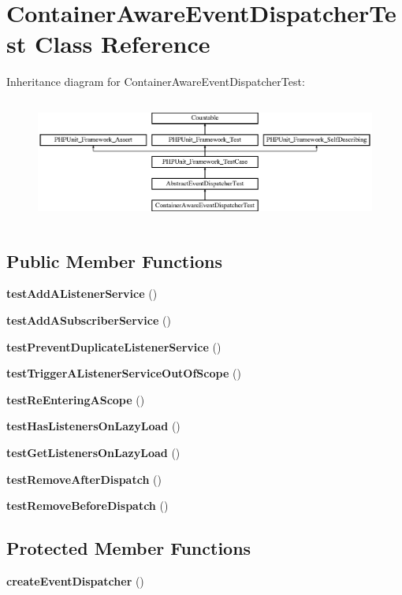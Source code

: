 \section{Container\+Aware\+Event\+Dispatcher\+Test Class Reference}
\label{class_symfony_1_1_component_1_1_event_dispatcher_1_1_tests_1_1_container_aware_event_dispatcher_test}
Inheritance diagram for Container\+Aware\+Event\+Dispatcher\+Test\+:\begin{figure}[H]
\begin{center}
\leavevmode
\includegraphics[height=4.093567cm]{class_symfony_1_1_component_1_1_event_dispatcher_1_1_tests_1_1_container_aware_event_dispatcher_test}
\end{center}
\end{figure}
\subsection*{Public Member Functions}
\begin{DoxyCompactItemize}
\item 
{\bf test\+Add\+A\+Listener\+Service} ()
\item 
{\bf test\+Add\+A\+Subscriber\+Service} ()
\item 
{\bf test\+Prevent\+Duplicate\+Listener\+Service} ()
\item 
{\bf test\+Trigger\+A\+Listener\+Service\+Out\+Of\+Scope} ()
\item 
{\bf test\+Re\+Entering\+A\+Scope} ()
\item 
{\bf test\+Has\+Listeners\+On\+Lazy\+Load} ()
\item 
{\bf test\+Get\+Listeners\+On\+Lazy\+Load} ()
\item 
{\bf test\+Remove\+After\+Dispatch} ()
\item 
{\bf test\+Remove\+Before\+Dispatch} ()
\end{DoxyCompactItemize}
\subsection*{Protected Member Functions}
\begin{DoxyCompactItemize}
\item 
{\bf create\+Event\+Dispatcher} ()
\end{DoxyCompactItemize}
